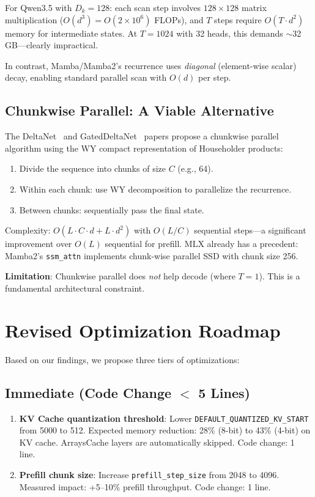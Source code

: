\documentclass[11pt,a4paper]{article}
\begin{document}
For Qwen3.5 with $D_k = 128$: each scan step involves $128 \times 128$ matrix multiplication ($O(d^3) = O(2 \times 10^6)$ FLOPs), and $T$ steps require $O(T \cdot d^2)$ memory for intermediate states. At $T = 1024$ with 32 heads, this demands $\sim$32\,GB---clearly impractical.

In contrast, Mamba/Mamba2's recurrence uses \emph{diagonal} (element-wise scalar) decay, enabling standard parallel scan with $O(d)$ per step.

\subsection{Chunkwise Parallel: A Viable Alternative}

The DeltaNet~\cite{deltanet} and GatedDeltaNet~\cite{gateddeltanet} papers propose a chunkwise parallel algorithm using the WY compact representation of Householder products:

\begin{enumerate}[leftmargin=2em]
  \item Divide the sequence into chunks of size $C$ (e.g., 64).
  \item Within each chunk: use WY decomposition to parallelize the recurrence.
  \item Between chunks: sequentially pass the final state.
\end{enumerate}

Complexity: $O(L \cdot C \cdot d + L \cdot d^2)$ with $O(L/C)$ sequential steps---a significant improvement over $O(L)$ sequential for prefill. MLX already has a precedent: Mamba2's \texttt{ssm\_attn} implements chunk-wise parallel SSD with chunk size 256.

\textbf{Limitation}: Chunkwise parallel does \emph{not} help decode (where $T=1$). This is a fundamental architectural constraint.

\section{Revised Optimization Roadmap}

Based on our findings, we propose three tiers of optimizations:

\subsection{Immediate (Code Change $<$ 5 Lines)}

\begin{enumerate}[leftmargin=2em]
  \item \textbf{KV Cache quantization threshold}: Lower \texttt{DEFAULT\_QUANTIZED\_KV\_START} from 5000 to 512. Expected memory reduction: 28\% (8-bit) to 43\% (4-bit) on KV cache. ArraysCache layers are automatically skipped. Code change: 1 line.

  \item \textbf{Prefill chunk size}: Increase \texttt{prefill\_step\_size} from 2048 to 4096. Measured impact: +5--10\% prefill throughput. Code change: 1 line.
\end{enumerate}
\end{document}
